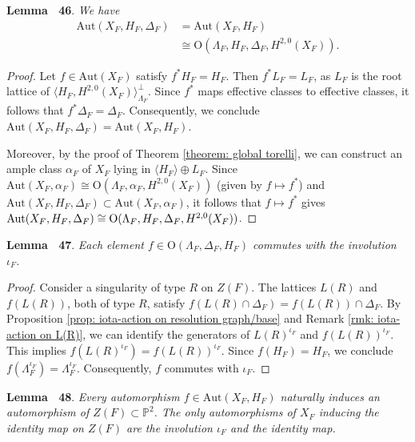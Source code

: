 \documentclass[
]{article}
\begin{document}
\textbf{Lemma~ 46}. \emph{\label{lem: describe Aut(X_F,H_F,Delta_F)} We
have \[\begin{aligned}
        \mathrm{Aut}(X_F,H_F,\Delta_F) &= \mathrm{Aut}(X_F,H_F) \\
                &\cong \mathrm{O}(\Lambda_F,H_F,\Delta_F,H^{2,0}(X_F)).
    
\end{aligned}\]}

\emph{Proof.} Let \(f\in \mathrm{Aut}(X_F)\) satisfy \(f^*H_F=H_F\).
Then \(f^*L_F=L_F\), as \(L_F\) is the root lattice of
\(\langle H_F,H^{2,0}(X_F)\rangle^\perp_{\Lambda_F}\). Since \(f^*\)
maps effective classes to effective classes, it follows that
\(f^*\Delta_F=\Delta_F\). Consequently, we conclude
\(\mathrm{Aut}(X_F,H_F,\Delta_F) = \mathrm{Aut}(X_F,H_F)\).

Moreover, by the proof of Theorem \ref{theorem: global torelli}, we can
construct an ample class \(\alpha_F\) of \(X_F\) lying in
\(\langle H_F\rangle\oplus L_F\). Since
\(\mathrm{Aut}(X_F,\alpha_F)\cong\mathrm{O}(\Lambda_F,\alpha_F,H^{2,0}(X_F))\)
(given by \(f\mapsto f^*\)) and
\(\mathrm{Aut}(X_F,H_F,\Delta_F) \subset \mathrm{Aut}(X_F,\alpha_F)\),
it follows that \(f\mapsto f^*\) gives
\(\mathrm{Aut}(X_F,H_F,\Delta_F) \cong \\ \mathrm{O}(\Lambda_F,H_F,\Delta_F,H^{2,0}(X_F))\).~◻

\textbf{Lemma~ 47}.
\emph{\label{lem: Aut(Lambda_F,H_F,Delta_F) commutes with iota_F} Each
element \(f\in \mathrm{O}(\Lambda_{F}, \Delta_{F},H_{F})\) commutes with
the involution \(\iota_{F}\).}

\emph{Proof.} Consider a singularity of type \(R\) on \(Z(F)\). The
lattices \(L(R)\) and \(f(L(R))\), both of type \(R\), satisfy
\(f(L(R)\cap \Delta_{F}) = f(L(R))\cap \Delta_{F}\). By Proposition
\ref{prop: iota-action on resolution graph/base} and Remark
\ref{rmk: iota-action on L(R)}, we can identify the generators of
\(L(R)^{\iota_{F}}\) and \(f(L(R))^{\iota_{F}}\). This implies
\(f(L(R)^{\iota_{F}}) = f(L(R))^{\iota_{F}}\). Since \(f(H_{F})=H_{F}\),
we conclude \(f(\Lambda_{F}^{\iota_{F}})=\Lambda_{F}^{\iota_{F}}\).
Consequently, \(f\) commutes with \(\iota_{F}\).~◻

\textbf{Lemma~ 48}. \emph{\label{lem: Aut(X_F,H_F) to Stab_Z(F)} Every
automorphism \(f\in \mathrm{Aut}(X_F,H_F)\) naturally induces an
automorphism of \(Z(F)\subset\mathbb{P}^2\). The only automorphisms of
\(X_F\) inducing the identity map on \(Z(F)\) are the involution
\(\iota_F\) and the identity map.}
\end{document}
